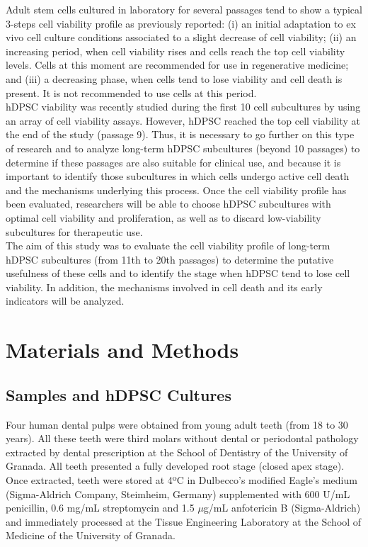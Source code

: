 \documentclass[a4paper,twocolumn,12pt]{article}
\begin{document}
Adult stem cells cultured in laboratory for several passages tend to show a typical 3-steps cell viability profile as previously reported: (i) an initial adaptation to ex vivo cell culture conditions associated to a slight decrease of cell viability; (ii) an increasing  period, when cell viability rises and cells reach the top cell viability levels. Cells at this moment are recommended for use in regenerative medicine; and (iii) a decreasing phase, when cells tend to lose viability and cell death is present. It is not recommended to use cells at this period.\\
hDPSC viability was recently studied during the first 10 cell subcultures by using an array of cell viability assays. However, hDPSC reached the top cell viability at the end of the study (passage 9). Thus, it is necessary to go further on this type of research and to analyze long-term hDPSC subcultures (beyond 10 passages) to determine if these passages are also suitable for clinical use, and because it is important to identify those subcultures in which cells undergo active cell death and the mechanisms underlying this process. Once the cell viability profile has been evaluated, researchers will be able to choose hDPSC subcultures with optimal cell viability and proliferation, as well as to discard low-viability subcultures for therapeutic use.\\
The aim of this study was to evaluate the cell viability profile of long-term hDPSC subcultures (from 11th to 20th passages) to determine the putative usefulness of these cells and to identify the stage when hDPSC tend to lose cell viability. In addition, the mechanisms involved in cell death and its early indicators will be analyzed.
\section{Materials and Methods}
\subsection{Samples and hDPSC Cultures}
Four human dental pulps were obtained from young adult teeth (from 18 to 30 years). All these teeth were third molars without dental or periodontal pathology extracted by dental prescription at the School of Dentistry of the University of Granada. All teeth presented a fully developed root stage (closed apex stage).\\
Once extracted, teeth were stored at 4ºC in Dulbecco’s modified Eagle’s medium (Sigma-Aldrich Company, Steimheim, Germany) supplemented with 600 U/mL penicillin, 0.6 mg/mL streptomycin and 1.5 $\mu$g/mL anfotericin B (Sigma-Aldrich) and immediately processed at the Tissue Engineering Laboratory at the School of Medicine of the University of Granada.\\
\end{document}
